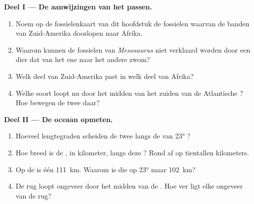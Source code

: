 \begin{problem}
\medskip
\noindent\textbf{Deel I --- De aanwijzingen van het passen.}
\begin{enumerate}
  \item Noem op de fossielenkaart van dit hoofdstuk de fossielen waarvan de
        banden van Zuid-Amerika doorlopen naar Afrika.
  \item Waarom kunnen de fossielen van \emph{Mesosaurus} niet verklaard
        worden door een dier dat van het ene  naar het andere
        zwom?
  \item Welk deel van Zuid-Amerika past in welk deel van Afrika?
  \item Welke soort  loopt nu door het midden van het zuiden van
        de Atlantische ? Hoe bewegen de twee  daar?
\end{enumerate}

\medskip
\noindent\textbf{Deel II --- De oceaan opmeten.}
\begin{enumerate}[resume]
  \item Hoeveel lengtegraden scheiden de twee  langs de 
        van \ang{23} ?
  \item Hoe breed is de , in kilometer, langs deze ?
        Rond af op tientallen kilometers.
  \item Op de  is één  \qty{111}{km}. Waarom is die op
        \ang{23}  maar \qty{102}{km}?
  \item De rug loopt ongeveer door het midden van de . Hoe ver ligt
        elke  ongeveer van de rug?
\end{enumerate}


\end{problem}

